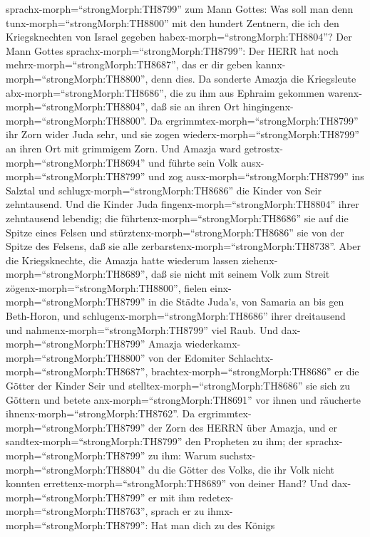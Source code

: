 sprachx-morph=``strongMorph:TH8799'' zum Mann Gottes: Was soll man denn
tunx-morph=``strongMorph:TH8800'' mit den hundert Zentnern, die ich den
Kriegsknechten von Israel gegeben habex-morph=``strongMorph:TH8804''?
Der Mann Gottes sprachx-morph=``strongMorph:TH8799'': Der HERR hat noch
mehrx-morph=``strongMorph:TH8687'', das er dir geben
kannx-morph=``strongMorph:TH8800'', denn dies.  Da sonderte
Amazja die Kriegsleute abx-morph=``strongMorph:TH8686'', die zu ihm aus
Ephraim gekommen warenx-morph=``strongMorph:TH8804'', daß sie an ihren
Ort hingingenx-morph=``strongMorph:TH8800''. Da
ergrimmtex-morph=``strongMorph:TH8799'' ihr Zorn wider Juda sehr, und
sie zogen wiederx-morph=``strongMorph:TH8799'' an ihren Ort mit
grimmigem Zorn.  Und Amazja ward
getrostx-morph=``strongMorph:TH8694'' und führte sein Volk
ausx-morph=``strongMorph:TH8799'' und zog
ausx-morph=``strongMorph:TH8799'' ins Salztal und
schlugx-morph=``strongMorph:TH8686'' die Kinder von Seir zehntausend.
 Und die Kinder Juda fingenx-morph=``strongMorph:TH8804''
ihrer zehntausend lebendig; die führtenx-morph=``strongMorph:TH8686''
sie auf die Spitze eines Felsen und
stürztenx-morph=``strongMorph:TH8686'' sie von der Spitze des Felsens,
daß sie alle zerbarstenx-morph=``strongMorph:TH8738''. 
Aber die Kriegsknechte, die Amazja hatte wiederum lassen
ziehenx-morph=``strongMorph:TH8689'', daß sie nicht mit seinem Volk zum
Streit zögenx-morph=``strongMorph:TH8800'', fielen
einx-morph=``strongMorph:TH8799'' in die Städte Juda's, von Samaria an
bis gen Beth-Horon, und schlugenx-morph=``strongMorph:TH8686'' ihrer
dreitausend und nahmenx-morph=``strongMorph:TH8799'' viel Raub.
 Und dax-morph=``strongMorph:TH8799'' Amazja
wiederkamx-morph=``strongMorph:TH8800'' von der Edomiter
Schlachtx-morph=``strongMorph:TH8687'',
brachtex-morph=``strongMorph:TH8686'' er die Götter der Kinder Seir und
stelltex-morph=``strongMorph:TH8686'' sie sich zu Göttern und betete
anx-morph=``strongMorph:TH8691'' vor ihnen und räucherte
ihnenx-morph=``strongMorph:TH8762''.  Da
ergrimmtex-morph=``strongMorph:TH8799'' der Zorn des HERRN über Amazja,
und er sandtex-morph=``strongMorph:TH8799'' den Propheten zu ihm; der
sprachx-morph=``strongMorph:TH8799'' zu ihm: Warum
suchstx-morph=``strongMorph:TH8804'' du die Götter des Volks, die ihr
Volk nicht konnten errettenx-morph=``strongMorph:TH8689'' von deiner
Hand?  Und dax-morph=``strongMorph:TH8799'' er mit ihm
redetex-morph=``strongMorph:TH8763'', sprach er zu
ihmx-morph=``strongMorph:TH8799'': Hat man dich zu des Königs
